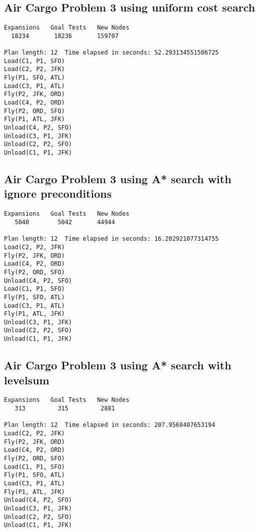 \documentclass[11pt,a4paper]{report}
\begin{document}
\subsection*{ Air Cargo Problem 3 using uniform cost search}
\begin{verbatim}
Expansions   Goal Tests   New Nodes
  18234       18236       159707

Plan length: 12  Time elapsed in seconds: 52.293134551506725
Load(C1, P1, SFO)
Load(C2, P2, JFK)
Fly(P1, SFO, ATL)
Load(C3, P1, ATL)
Fly(P2, JFK, ORD)
Load(C4, P2, ORD)
Fly(P2, ORD, SFO)
Fly(P1, ATL, JFK)
Unload(C4, P2, SFO)
Unload(C3, P1, JFK)
Unload(C2, P2, SFO)
Unload(C1, P1, JFK)
\end{verbatim}

\subsection*{Air Cargo Problem 3 using A* search with ignore preconditions}
\begin{verbatim}
Expansions   Goal Tests   New Nodes
   5040        5042       44944

Plan length: 12  Time elapsed in seconds: 16.202921077314755
Load(C2, P2, JFK)
Fly(P2, JFK, ORD)
Load(C4, P2, ORD)
Fly(P2, ORD, SFO)
Unload(C4, P2, SFO)
Load(C1, P1, SFO)
Fly(P1, SFO, ATL)
Load(C3, P1, ATL)
Fly(P1, ATL, JFK)
Unload(C3, P1, JFK)
Unload(C2, P2, SFO)
Unload(C1, P1, JFK)
\end{verbatim}



\subsection*{Air Cargo Problem 3 using A* search with levelsum}
\begin{verbatim}
Expansions   Goal Tests   New Nodes
   313         315         2881

Plan length: 12  Time elapsed in seconds: 207.9568407653194
Load(C2, P2, JFK)
Fly(P2, JFK, ORD)
Load(C4, P2, ORD)
Fly(P2, ORD, SFO)
Load(C1, P1, SFO)
Fly(P1, SFO, ATL)
Load(C3, P1, ATL)
Fly(P1, ATL, JFK)
Unload(C4, P2, SFO)
Unload(C3, P1, JFK)
Unload(C2, P2, SFO)
Unload(C1, P1, JFK)
\end{verbatim}
\end{document}
